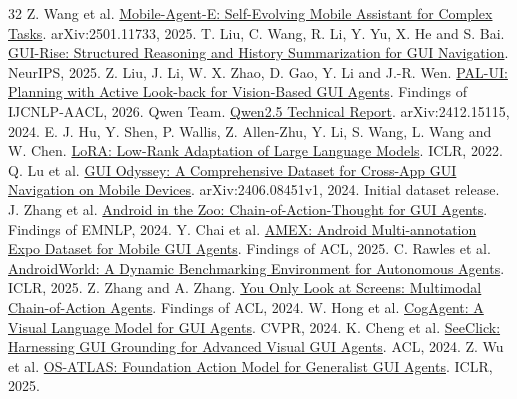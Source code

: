 \begin{thebibliography}{32}
 Z. Wang et al. \href{https://arxiv.org/abs/2501.11733}{Mobile-Agent-E: Self-Evolving Mobile Assistant for Complex Tasks}. arXiv:2501.11733, 2025.
 T. Liu, C. Wang, R. Li, Y. Yu, X. He and S. Bai. \href{https://papers.nips.cc/paper_files/paper/2025/hash/f144ab9985c739a5091ec188a2688644-Abstract-Conference.html}{GUI-Rise: Structured Reasoning and History Summarization for GUI Navigation}. NeurIPS, 2025.
 Z. Liu, J. Li, W. X. Zhao, D. Gao, Y. Li and J.-R. Wen. \href{https://aclanthology.org/2026.findings-aacl.13/}{PAL-UI: Planning with Active Look-back for Vision-Based GUI Agents}. Findings of IJCNLP-AACL, 2026.
 Qwen Team. \href{https://arxiv.org/abs/2412.15115}{Qwen2.5 Technical Report}. arXiv:2412.15115, 2024.
 E. J. Hu, Y. Shen, P. Wallis, Z. Allen-Zhu, Y. Li, S. Wang, L. Wang and W. Chen. \href{https://openreview.net/pdf?id=nZeVKeeFYf9}{LoRA: Low-Rank Adaptation of Large Language Models}. ICLR, 2022.
 Q. Lu et al. \href{https://arxiv.org/abs/2406.08451v1}{GUI Odyssey: A Comprehensive Dataset for Cross-App GUI Navigation on Mobile Devices}. arXiv:2406.08451v1, 2024. Initial dataset release.
 J. Zhang et al. \href{https://aclanthology.org/2024.findings-emnlp.702/}{Android in the Zoo: Chain-of-Action-Thought for GUI Agents}. Findings of EMNLP, 2024.
 Y. Chai et al. \href{https://aclanthology.org/2025.findings-acl.110/}{AMEX: Android Multi-annotation Expo Dataset for Mobile GUI Agents}. Findings of ACL, 2025.
 C. Rawles et al. \href{https://proceedings.iclr.cc/paper_files/paper/2025/hash/01a83bc2f2732a58e6aa731e659e7101-Abstract-Conference.html}{AndroidWorld: A Dynamic Benchmarking Environment for Autonomous Agents}. ICLR, 2025.
 Z. Zhang and A. Zhang. \href{https://aclanthology.org/2024.findings-acl.186/}{You Only Look at Screens: Multimodal Chain-of-Action Agents}. Findings of ACL, 2024.
 W. Hong et al. \href{https://openaccess.thecvf.com/content/CVPR2024/html/Hong_CogAgent_A_Visual_Language_Model_for_GUI_Agents_CVPR_2024_paper.html}{CogAgent: A Visual Language Model for GUI Agents}. CVPR, 2024.
 K. Cheng et al. \href{https://aclanthology.org/2024.acl-long.505/}{SeeClick: Harnessing GUI Grounding for Advanced Visual GUI Agents}. ACL, 2024.
 Z. Wu et al. \href{https://proceedings.iclr.cc/paper_files/paper/2025/hash/0faa4bc5f522076947a030273629d4fe-Abstract-Conference.html}{OS-ATLAS: Foundation Action Model for Generalist GUI Agents}. ICLR, 2025.

\end{thebibliography}
